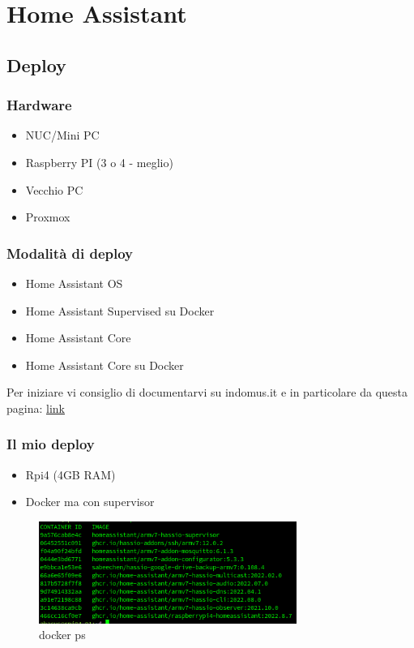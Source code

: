 \documentclass[hyperref={pdfpagelabels=false}]{beamer}
\begin{document}
	
	\section{Home Assistant} 
	\subsection{Deploy}
	\begin{frame}
		\frametitle{Hardware}
		\begin{itemize}
			\item NUC/Mini PC 
			\item Raspberry PI (3 o 4 - meglio)
			\item Vecchio PC
			\item Proxmox
		\end{itemize}
	\end{frame}

	\begin{frame}
		\frametitle{Modalità di deploy}
		\begin{itemize}
			\item Home Assistant OS  
			\item Home Assistant Supervised su Docker 
			\item Home Assistant Core 
			\item Home Assistant Core su Docker
		\end{itemize}
	\medskip
		\normalsize Per iniziare vi consiglio di documentarvi su indomus.it e in particolare da questa pagina: \href{https://indomus.it/formazione/home-assistant-su-raspberry-pi-varie-installazioni-le-cose-da-fare/}{link}
	\end{frame}
	
	\begin{frame}
		\frametitle{Il mio deploy}
		\begin{itemize}
			\item Rpi4 (4GB RAM)  
			\item Docker ma con supervisor
		\end{itemize}
		\begin{figure}
			\centering
			\includegraphics[width=0.75\textwidth]{./images/docker-ps.png}
			\caption{docker ps}
			\label{fig:docker-ps}
		\end{figure}
	\end{frame}
	
\end{document}
